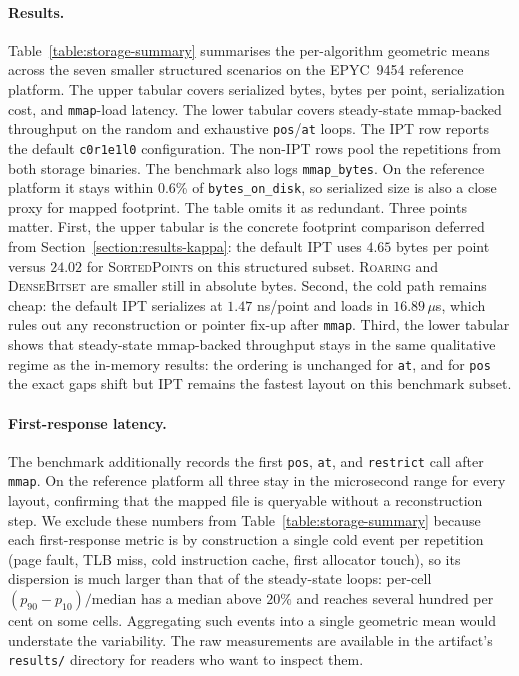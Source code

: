 \documentclass[manuscript,screen,review]{acmart}
\theoremstyle{definition}
\theoremstyle{plain}
\begin{document}
\paragraph{Results.}
Table~\ref{table:storage-summary} summarises the per-algorithm
geometric means across the seven smaller structured scenarios on the
EPYC~9454 reference platform. The upper tabular covers serialized
bytes, bytes per point, serialization cost, and \texttt{mmap}-load
latency. The lower tabular covers steady-state mmap-backed throughput
on the random and exhaustive \texttt{pos}/\texttt{at} loops. The IPT
row reports the default \texttt{c0r1e1l0} configuration. The non-IPT
rows pool the repetitions from both storage binaries. The benchmark
also logs \texttt{mmap\_bytes}. On the reference platform it stays
within 0.6\% of \texttt{bytes\_on\_disk}, so serialized size is also a
close proxy for mapped footprint. The table omits it as redundant.
Three points matter. First, the upper tabular is the concrete
footprint comparison deferred from Section~\ref{section:results-kappa}:
the default IPT uses $4.65$ bytes per point versus $24.02$ for
\textsc{SortedPoints} on this structured subset. \textsc{Roaring} and
\textsc{DenseBitset} are smaller still in absolute bytes. Second, the
cold path remains cheap: the default IPT serializes at $1.47$
ns/point and loads in $16.89\,\mu$s, which rules out any
reconstruction or pointer fix-up after \texttt{mmap}. Third, the lower
tabular shows that steady-state mmap-backed throughput stays in the
same qualitative regime as the in-memory results: the ordering is
unchanged for \texttt{at}, and for \texttt{pos} the exact gaps shift
but IPT remains the fastest layout on this benchmark subset.

\paragraph{First-response latency.} The benchmark additionally records
the first \texttt{pos}, \texttt{at}, and \texttt{restrict} call after
\texttt{mmap}. On the reference platform all three stay in the
microsecond range for every layout, confirming that the mapped file
is queryable without a reconstruction step. We exclude these numbers
from Table~\ref{table:storage-summary} because each first-response
metric is by construction a single cold event per repetition (page
fault, TLB miss, cold instruction cache, first allocator touch), so
its dispersion is much larger than that of the steady-state loops:
per-cell $(p_{90}-p_{10})/\mathrm{median}$ has a median above $20\%$
and reaches several hundred per cent on some cells. Aggregating such
events into a single geometric mean would understate the variability.
The raw measurements are available in the artifact's \texttt{results/}
directory for readers who want to inspect them.
\end{document}
